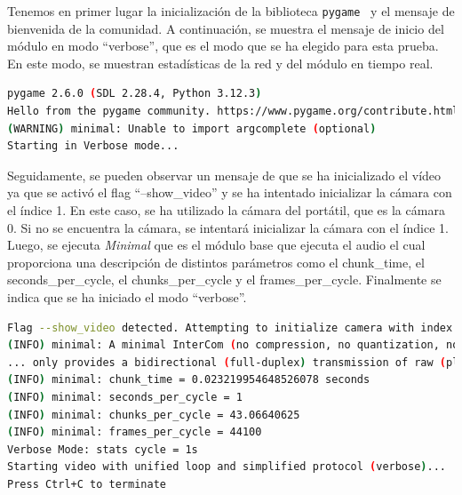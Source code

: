 \newpage

Tenemos en primer lugar la inicialización de la biblioteca \texttt{pygame}~\cite{pygame} y el mensaje de bienvenida de la comunidad. A continuación, se muestra el mensaje de inicio del módulo en modo ``verbose'', que es el modo que se ha elegido para esta prueba. En este modo, se muestran estadísticas de la red y del módulo en tiempo real.
\begin{lstlisting}[language=bash,basicstyle=\ttfamily\scriptsize]
pygame 2.6.0 (SDL 2.28.4, Python 3.12.3)
Hello from the pygame community. https://www.pygame.org/contribute.html
(WARNING) minimal: Unable to import argcomplete (optional)
Starting in Verbose mode...
\end{lstlisting}

Seguidamente, se pueden observar un mensaje de que se ha inicializado el vídeo ya que se activó el flag ``--show\_video'' y se ha intentado inicializar la cámara con el índice 1. En este caso, se ha utilizado la cámara del portátil, que es la cámara 0. Si no se encuentra la cámara, se intentará inicializar la cámara con el índice 1. Luego, se ejecuta \textit{Minimal} que es el módulo base que ejecuta el audio el cual proporciona una descripción de distintos parámetros como el chunk\_time, el seconds\_per\_cycle, el chunks\_per\_cycle y el frames\_per\_cycle. Finalmente se indica que se ha iniciado el modo ``verbose''.

\begin{lstlisting}[language=bash,basicstyle=\ttfamily\scriptsize]
Flag --show_video detected. Attempting to initialize camera with index 1...
(INFO) minimal: A minimal InterCom (no compression, no quantization, no transform, 
... only provides a bidirectional (full-duplex) transmission of raw (playable) chunks. 
(INFO) minimal: chunk_time = 0.023219954648526078 seconds
(INFO) minimal: seconds_per_cycle = 1
(INFO) minimal: chunks_per_cycle = 43.06640625
(INFO) minimal: frames_per_cycle = 44100
Verbose Mode: stats cycle = 1s
Starting video with unified loop and simplified protocol (verbose)...
Press Ctrl+C to terminate
\end{lstlisting}

